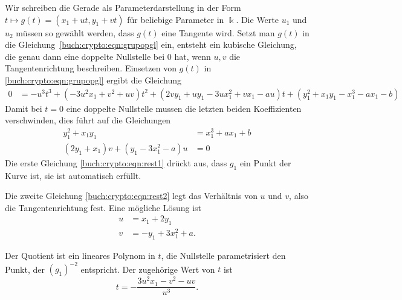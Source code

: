 Wir schreiben die Gerade als Parameterdarstellung in der Form
\(
t\mapsto g(t)= (x_1+ut, y_1+vt)
\)
für beliebige Parameter in $\Bbbk$.
Die Werte $u_1$ und $u_2$ müssen so gewählt werden, dass $g(t)$ eine
Tangente wird.
Setzt man $g(t)$ in die Gleichung~\eqref{buch:crypto:eqn:grupopgl} ein,
entsteht ein kubische Gleichung, die genau dann eine doppelte Nullstelle
bei $0$ hat, wenn $u,v$ die Tangentenrichtung beschreiben.
Einsetzen von $g(t)$ in \eqref{buch:crypto:eqn:grupopgl}
ergibt die Gleichung
\begin{align}
0
&=
-u^3t^3
+
(-3u^2x_{1}+v^2+uv)t^2
+
(2vy_1+uy_1-3ux_1^2+vx_1-au)t
+
(y_1^2+x_1y_1-x_1^3-ax_1-b)
\label{buch:crypto:eqn:tangente1}
\end{align}
Damit bei $t=0$ eine doppelte Nullstelle mussen die letzten beiden
Koeffizienten verschwinden, dies führt auf die Gleichungen
\begin{align}
y_1^2+x_1y_1&=x_1^3+ax_1+b
\label{buch:crypto:eqn:rest1}
\\
(2y_1
+x_1)v
+(y_1
-3x_1^2
-a)u
&=0
\label{buch:crypto:eqn:rest2}
\end{align}
Die erste Gleichung \eqref{buch:crypto:eqn:rest1} drückt aus,
dass $g_1$ ein Punkt der Kurve ist, sie ist automatisch erfüllt.

Die zweite Gleichung
\eqref{buch:crypto:eqn:rest2}
legt das Verhältnis von $u$ und $v$, also die
\label{buch:crypto:eqn:rest2}
Tangentenrichtung fest.
Eine mögliche Lösung ist
\begin{equation}
\begin{aligned}
u &= x_1+2y_1
\\
v &= -y_1+3x_1^2+a.
\end{aligned}
\label{buch:crypto:eqn:uv}
\end{equation}

Der Quotient ist ein lineares Polynom in $t$, die Nullstelle parametrisiert
den Punkt, der $(g_1)^{-2}$ entspricht.
Der zugehörige Wert von $t$ ist
\begin{equation}
t=-\frac{3u^2x_1-v^2-uv}{u^3}.
\label{buch:crypto:eqn:t}
\end{equation}


